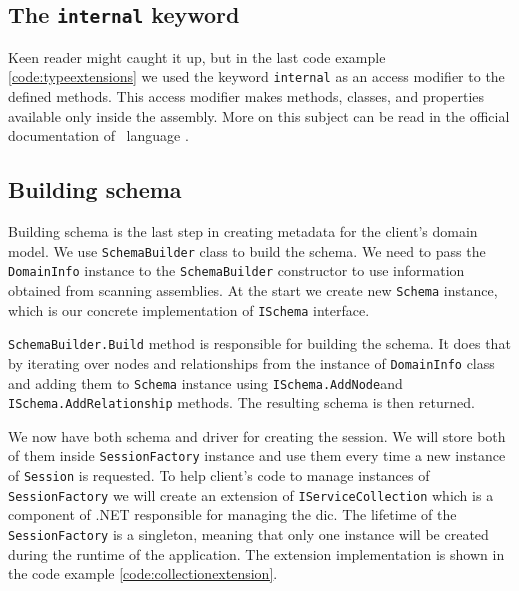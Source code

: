 \subsection{The \texttt{internal} keyword}

Keen reader might caught it up, but in the last code example \ref{code:typeextensions} we used the keyword \texttt{internal}
as an access modifier to the defined methods. This access modifier makes methods, classes, and properties available only inside the assembly. More on this subject
can be read in the official documentation of \CS\ language \cite{billwagner_internal_nodate}.

\subsection {Building schema}

Building schema is the last step in creating metadata for the client's domain model.
We use \texttt{SchemaBuilder} class to build the schema.
We need to pass the \texttt{DomainInfo} instance to the \texttt{SchemaBuilder} constructor to use information obtained from scanning assemblies.
At the start we create new \texttt{Schema} instance, which is our concrete implementation of \texttt{ISchema} interface.

\texttt{SchemaBuilder.Build} method is responsible for building the schema.
It does that by iterating over nodes and relationships from the instance of \texttt{DomainInfo} class and adding them to \texttt{Schema} instance using \texttt{ISchema.AddNode}\linebreak and \texttt{ISchema.AddRelationship} methods.
The resulting schema is then returned.

We now have both schema and driver for creating the session.
We will store both of them inside \texttt{SessionFactory} instance and use them every time a new instance of \texttt{Session} is requested.
To help client's code to manage instances of \texttt{SessionFactory} we will create an extension of \texttt{IServiceCollection} which is a component of .NET responsible for managing the \acrfull{dic}.
The lifetime of the \texttt{SessionFactory} is a singleton, meaning that only one instance will be created during the runtime of the application.
The extension implementation is shown in the code example \ref{code:collectionextension}.


